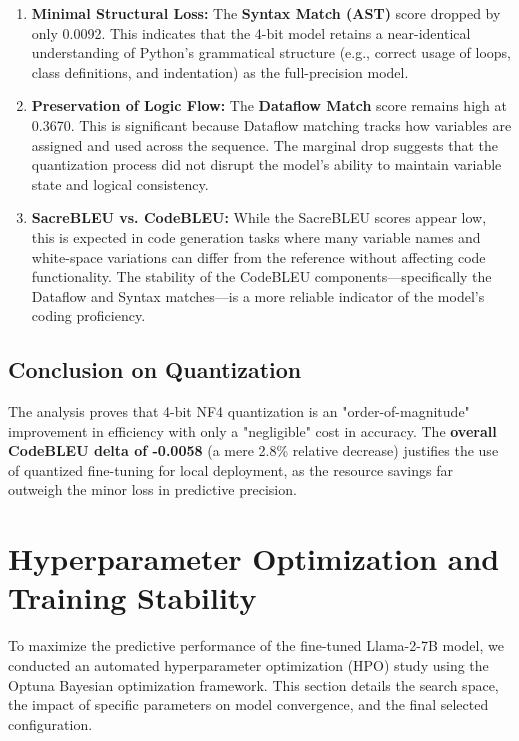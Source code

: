 \begin{enumerate}
    \item \textbf{Minimal Structural Loss:} The \textbf{Syntax Match (AST)} score dropped by only 0.0092. This indicates that the 4-bit model retains a near-identical understanding of Python's grammatical structure (e.g., correct usage of loops, class definitions, and indentation) as the full-precision model.
    
    \item \textbf{Preservation of Logic Flow:} The \textbf{Dataflow Match} score remains high at 0.3670. This is significant because Dataflow matching tracks how variables are assigned and used across the sequence. The marginal drop suggests that the quantization process did not disrupt the model's ability to maintain variable state and logical consistency.

    
    
    \item \textbf{SacreBLEU vs. CodeBLEU:} While the SacreBLEU scores appear low, this is expected in code generation tasks where many variable names and white-space variations can differ from the reference without affecting code functionality. The stability of the CodeBLEU components—specifically the Dataflow and Syntax matches—is a more reliable indicator of the model's coding proficiency.
\end{enumerate}

\subsection{Conclusion on Quantization}
The analysis proves that 4-bit NF4 quantization is an "order-of-magnitude" improvement in efficiency with only a "negligible" cost in accuracy. The \textbf{overall CodeBLEU delta of -0.0058} (a mere 2.8\% relative decrease) justifies the use of quantized fine-tuning for local deployment, as the resource savings far outweigh the minor loss in predictive precision.

\section{Hyperparameter Optimization and Training Stability}
To maximize the predictive performance of the fine-tuned Llama-2-7B model, we conducted an automated hyperparameter optimization (HPO) study using the Optuna Bayesian optimization framework. This section details the search space, the impact of specific parameters on model convergence, and the final selected configuration.


